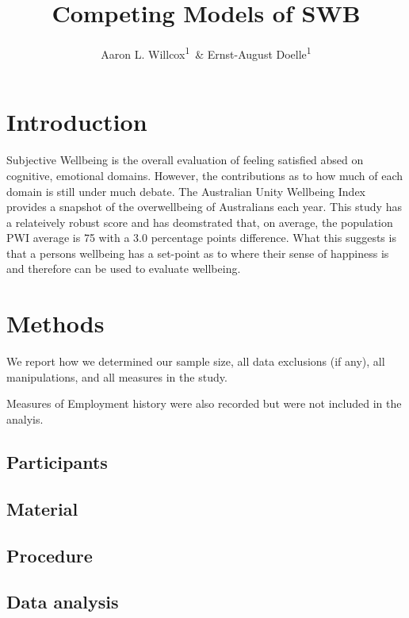 \documentclass[man,floatsintext]{apa6}
\title{Competing Models of SWB}
\author{Aaron L. Willcox\textsuperscript{1}~\& Ernst-August
Doelle\textsuperscript{1}}
\date{}
\affiliation{
\vspace{0.5cm}
\textsuperscript{1} Deakin University\\\textsuperscript{2} Konstanz Business School}
\begin{document}
\maketitle

\section{Introduction}\label{introduction}

Subjective Wellbeing is the overall evaluation of feeling satisfied
absed on cognitive, emotional domains. However, the contributions as to
how much of each domain is still under much debate. The Australian Unity
Wellbeing Index provides a snapshot of the overwellbeing of Australians
each year. This study has a relateively robust score and has deomstrated
that, on average, the population PWI average is 75 with a 3.0 percentage
points difference. What this suggests is that a persons wellbeing has a
set-point as to where their sense of happiness is and therefore can be
used to evaluate wellbeing.

\section{Methods}\label{methods}

We report how we determined our sample size, all data exclusions (if
any), all manipulations, and all measures in the study.

Measures of Employment history were also recorded but were not included
in the analyis.

\subsection{Participants}\label{participants}

\subsection{Material}\label{material}

\subsection{Procedure}\label{procedure}

\subsection{Data analysis}\label{data-analysis}
\end{document}
